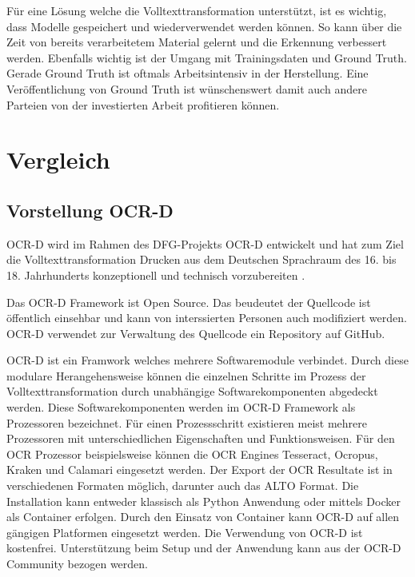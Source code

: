 \documentclass[a4paper,oneside, 12pt]{report}
\begin{document}
Für eine Lösung welche die Volltexttransformation unterstützt, ist es wichtig, dass Modelle gespeichert und wiederverwendet werden können. So kann über die Zeit von bereits verarbeitetem Material gelernt und die Erkennung verbessert werden. Ebenfalls wichtig ist der Umgang mit Trainingsdaten und Ground Truth. Gerade Ground Truth ist oftmals Arbeitsintensiv in der Herstellung. Eine Veröffentlichung von Ground Truth ist wünschenswert damit auch andere Parteien von der investierten Arbeit profitieren können.

\chapter{Vergleich}\label{sec:vergleich}

\section{Vorstellung OCR-D}
OCR-D wird im Rahmen des DFG-Projekts OCR-D entwickelt und hat zum Ziel die Volltexttransformation Drucken aus dem Deutschen Sprachraum des 16. bis 18. Jahrhunderts konzeptionell und technisch vorzubereiten \cite{standOCR-D}. 

Das OCR-D Framework ist Open Source. Das beudeutet der Quellcode ist öffentlich einsehbar und kann von interssierten Personen auch modifiziert werden. OCR-D verwendet zur Verwaltung des Quellcode ein Repository auf GitHub.\cite{ocrdgithub}

OCR-D ist ein Framwork welches mehrere Softwaremodule verbindet. Durch diese modulare Herangehensweise können die einzelnen Schritte im Prozess der Volltexttransformation durch unabhängige Softwarekomponenten abgedeckt werden. Diese Softwarekomponenten werden im OCR-D Framework als Prozessoren bezeichnet. Für einen Prozessschritt existieren meist mehrere Prozessoren mit unterschiedlichen Eigenschaften und Funktionsweisen. Für den \ac{OCR} Prozessor beispielsweise können die OCR Engines Tesseract, Ocropus, Kraken und Calamari eingesetzt werden. Der Export der OCR Resultate ist in verschiedenen Formaten möglich, darunter auch das ALTO Format. Die Installation kann entweder klassisch als Python Anwendung oder mittels Docker als Container erfolgen. Durch den Einsatz von Container kann OCR-D auf allen gängigen Platformen eingesetzt werden. Die Verwendung von OCR-D ist kostenfrei. Unterstützung beim Setup und der Anwendung kann aus der OCR-D Community bezogen werden. \cite{ocrdfaq}
\end{document}
